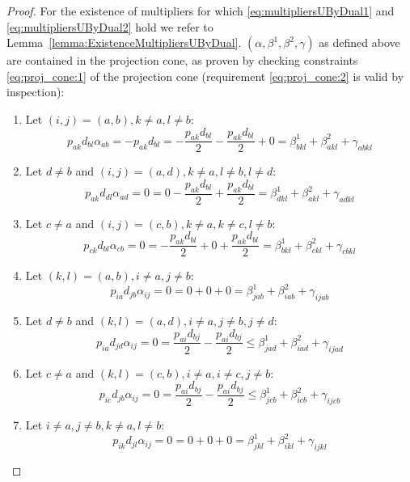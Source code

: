 \begin{proof}
	For the existence of multipliers for which \eqref{eq:multipliersUByDual1} and \eqref{eq:multipliersUByDual2} hold we refer to Lemma~\ref{lemma:ExistenceMultipliersUByDual}. $(\alpha,\beta^1,\beta^2,\gamma)$ as defined above are contained in the projection cone, as proven by checking constraints \eqref{eq:proj_cone:1} of the projection cone (requirement \eqref{eq:proj_cone:2} is valid by inspection):
	\begin{enumerate}
		\item Let $(i,j) = (a,b), k\neq a, l\neq b$:
			\begin{equation*}
				p_{ak}d_{bl}\alpha_{ab} = -p_{ak}d_{bl} = -\frac{p_{ak}d_{bl}}{2}-\frac{p_{ak}d_{bl}}{2} + 0 = \beta^1_{bkl} + \beta^2_{akl} + \gamma_{abkl}
			\end{equation*}
		\item Let $d \neq b$ and $(i,j) = (a,d), k\neq a, l\neq b, l\neq d$:
			\begin{equation*}
				p_{ak}d_{dl}\alpha_{ad} = 0 = 0 - \frac{p_{ak}d_{bl}}{2} + \frac{p_{ak}d_{bl}}{2} = \beta^1_{dkl} + \beta^2_{akl} + \gamma_{adkl}
			\end{equation*}
		\item Let $c\neq a$ and $(i,j) = (c,b), k\neq a, k\neq c, l\neq b$:
			\begin{equation*}
				p_{ck}d_{bl}\alpha_{cb} = 0 = -\frac{p_{ak}d_{bl}}{2} + 0 +\frac{p_{ak}d_{bl}}{2} = \beta^1_{bkl} + \beta^2_{ckl} + \gamma_{cbkl}
			\end{equation*}
		\item Let $(k,l) = (a,b), i\neq a, j\neq b$:
			\begin{equation*}
				p_{ia}d_{jb}\alpha_{ij} = 0 = 0 + 0 + 0 = \beta^1_{jab} + \beta^2_{iab} + \gamma_{ijab}
			\end{equation*}
		\item Let $d\neq b$ and $(k,l) = (a,d), i\neq a, j\neq b, j\neq d$:
			\begin{equation*}
				p_{ia}d_{jd}\alpha_{ij} = 0 = \frac{p_{ai}d_{bj}}{2} - \frac{p_{ai}d_{bj}}{2} \leq \beta^1_{jad} + \beta^2_{iad} + \gamma_{ijad}
			\end{equation*}
		\item Let $c\neq a$ and $(k,l) = (c,b), i\neq a, i\neq c, j\neq b$:
			\begin{equation*}
				p_{ic}d_{jb}\alpha_{ij} = 0 = \frac{p_{ai}d_{bj}}{2} - \frac{p_{ai}d_{bj}}{2} \leq \beta^1_{jcb} + \beta^2_{icb} + \gamma_{ijcb}
			\end{equation*}
		\item Let $i \neq a, j\neq b, k\neq a, l\neq b:$
			\begin{equation*}
				p_{ik}d_{jl}\alpha_{ij} = 0 = 0 + 0 + 0 = \beta^1_{jkl} + \beta^2_{ikl} + \gamma_{ijkl}
			\end{equation*}
	\end{enumerate}
	

\end{proof}
